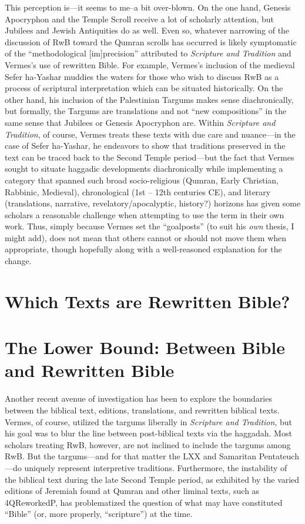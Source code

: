 This perception is---it seems to me--a bit over-blown. On the one hand,
Genesis Apocryphon and the Temple Scroll receive a lot of scholarly
attention, but Jubilees and Jewish Antiquities do as well. Even so,
whatever narrowing of the discussion of RwB toward the Qumran scrolls
has occurred is likely symptomatic of the ``methodological
{[}im{]}precision'' attributed to \emph{Scripture and Tradition} and
Vermes's use of rewritten Bible. For example, Vermes's inclusion of the
medieval Sefer ha-Yashar muddies the waters for those who wish to
discuss RwB as a process of scriptural interpretation which can be
situated historically. On the other hand, his inclusion of the
Palestinian Targums makes sense diachronically, but formally, the
Targums are translations and not ``new compositions'' in the same sense
that Jubilees or Genesis Apocryphon are. Within
\emph{Scripture and Tradition}, of course, Vermes treats these texts
with due care and nuance---in the case of Sefer ha-Yashar, he endeavors
to show that traditions preserved in the text can be traced back to the
Second Temple period---but the fact that Vermes sought to situate
haggadic developments diachronically while implementing a category that
spanned such broad socio-religious (Qumran, Early Christian, Rabbinic,
Medieval), chronological (1st -- 12th centuries CE), and literary
(translations, narrative, revelatory/apocalyptic, history?) horizons has
given some scholars a reasonable challenge when attempting to use the
term in their own work. Thus, simply because Vermes set the
``goalposts'' (to suit his \emph{own} thesis, I might add), does not
mean that others cannot or should not move them when appropriate, though
hopefully along with a well-reasoned explanation for the change.

\section{Which Texts are Rewritten Bible?}\label{which-texts-are-rwb}

\section{The Lower Bound: Between Bible and Rewritten
Bible}\label{the-lower-bound-between-bible-and-rewritten-bible}

Another recent avenue of investigation has been to explore the
boundaries between the biblical text, editions, translations, and
rewritten biblical texts. Vermes, of course, utilized the targums
liberally in \emph{Scripture and Tradition}, but his goal was to blur
the line between post-biblical texts via the haggadah. Most scholars
treating RwB, however, are not inclined to include the targums among
RwB. But the targums---and for that matter the LXX and Samaritan
Pentateuch---do uniquely represent interpretive traditions. Furthermore,
the instability of the biblical text during the late Second Temple
period, as exhibited by the varied editions of Jeremiah found at Qumran
and other liminal texts, such as 4QReworkedP, has problematized the
question of what may have constituted ``Bible'' (or, more properly,
``scripture'') at the time.

